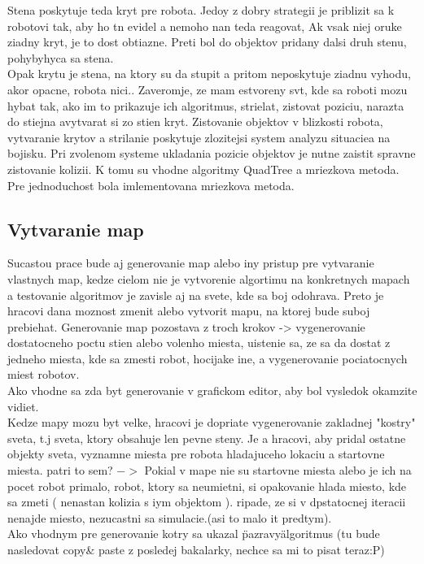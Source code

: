\documentclass[a4paper,11pt,final]{report}
\begin{document}
Stena poskytuje teda kryt pre robota. Jedoy z dobry strategii je priblizit sa k robotovi tak, aby ho tn evidel a nemoho nan teda reagovat, Ak vsak niej oruke ziadny kryt, je to dost obtiazne. Preti bol do objektov pridany dalsi druh stenu, pohybyhyca sa stena.\\
Opak krytu je stena, na ktory su da stupit a pritom neposkytuje ziadnu vyhodu, akor opacne, robota nici..%
Zaveromje, ze mam estvoreny svt, kde sa roboti mozu hybat tak, ako im to prikazuje ich algoritmus, strielat, zistovat poziciu, narazta do stiejna avytvarat si zo stien kryt. Zistovanie objektov v blizkosti robota, vytvaranie krytov a strilanie poskytuje zlozitejsi system analyzu situaciea na bojisku.
Pri zvolenom systeme ukladania pozicie objektov je nutne zaistit spravne zistovanie kolizii. K tomu su vhodne algoritmy QuadTree a mriezkova metoda. %
Pre jednoduchost bola imlementovana mriezkova metoda.\\
\subsection{Vytvaranie map}
Sucastou prace bude aj generovanie map alebo iny pristup pre vytvaranie vlastnych map, kedze cielom nie je vytvorenie algortimu na konkretnych mapach a
testovanie algoritmov je zavisle aj na svete, kde sa boj odohrava. Preto je hracovi dana moznost zmenit alebo vytvorit mapu, na ktorej bude suboj prebiehat.
Generovanie map pozostava z troch krokov -> vygenerovanie dostatocneho poctu stien alebo volenho miesta, uistenie sa, ze sa da dostat z jedneho miesta, kde sa zmesti robot, hocijake ine, a vygenerovanie pociatocnych miest robotov.\\
Ako vhodne sa zda byt generovanie v grafickom editor, aby bol vysledok okamzite vidiet.\\
Kedze mapy mozu byt velke, hracovi je dopriate vygenerovanie zakladnej "kostry" sveta, t.j sveta, ktory obsahuje len pevne steny. Je a hracovi, aby pridal ostatne objekty sveta, vyznamne miesta pre robota hladajuceho lokaciu a startovne miesta. patri to sem? $->$ Pokial v mape nie su startovne miesta alebo je ich na pocet robot primalo, robot, ktory sa neumietni, si opakovanie hlada miesto, kde sa zmeti ( nenastan kolizia s iym objektom ). ripade, ze si v dpstatocnej iteracii nenajde miesto, nezucastni sa simulacie.(asi to malo it predtym).\\
Ako vhodnym pre generovanie kotry sa ukazal \"pazravy\" algoritmus (tu bude nasledovat copy\& paste z posledej bakalarky, nechce sa mi to pisat teraz:P)
\end{document}
